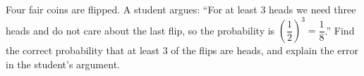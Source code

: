 Four fair coins are flipped. A student argues: ``For at least $3$ heads we need three heads and do not care about the last flip, so the probability is $\left(\dfrac{1}{2}\right)^3=\dfrac{1}{8}$.'' Find the correct probability that at least $3$ of the flips are heads, and explain the error in the student's argument.
